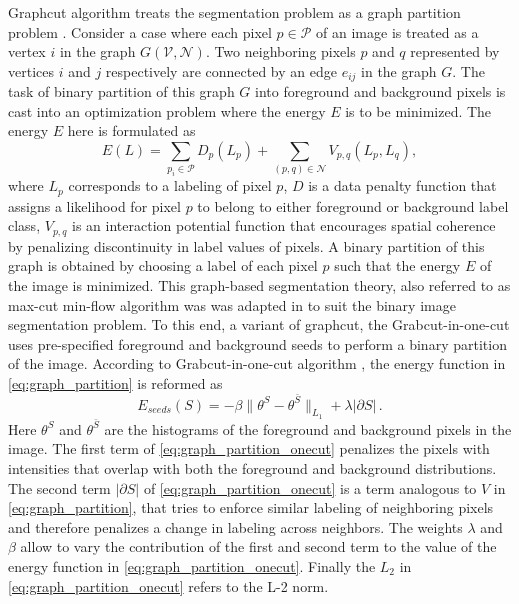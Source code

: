 \documentclass {udthesis}
\begin{document}
Graphcut algorithm treats the segmentation problem as a graph partition problem \cite{mincut_maxflow}. Consider a case where each pixel $p \in \mathcal{P}$ of an image is treated as a vertex $i$ in the graph $G(\mathcal{V},\mathcal{N})$. Two neighboring pixels $p$ and $q$ represented by vertices $i$ and $j$ respectively are connected by an edge $e_{ij}$ in the graph $G$. The task of binary partition of this graph $G$ into foreground and background pixels is cast into an optimization problem where the energy $E$ is to be minimized. The energy $E$ here is formulated as 
%
\begin{equation}	\label{eq:graph_partition}
  E(L)=\sum\limits_{p_i\in \mathcal{P}} D_p(L_p)+\sum\limits_{(p,q)\in \mathcal{N}} V_{p,q} (L_p,L_q),
\end{equation}
%
where $L_p$ corresponds to a labeling of pixel $p$, $D$ is a data penalty function that assigns a likelihood for pixel $p$ to belong to either foreground or background label class, $V_{p,q}$ is an interaction potential function that encourages spatial coherence by penalizing discontinuity in label values of pixels. A binary partition of this graph is obtained by choosing a label of each pixel $p$ such that the energy $E$ of the image is minimized. This graph-based segmentation theory, also referred to as max-cut min-flow algorithm was was adapted in \cite{onecut} to suit the binary image segmentation problem. To this end, a variant of graphcut, the Grabcut-in-one-cut \cite{onecut} uses pre-specified foreground and background seeds to perform a binary partition of the image. According to Grabcut-in-one-cut algorithm \cite{onecut}, the energy function in \eqref{eq:graph_partition} is reformed as
%
\begin{equation} \label{eq:graph_partition_onecut}
  E_{seeds}(S)=-\beta \| \theta^S-\theta^{\bar{S}} \|_{L_1}+\lambda|\partial S|\,.
\end{equation}
%
Here $\theta^S$ and $\theta^{\bar{S}}$ are the histograms of the foreground and background pixels in the image. The first term of \eqref{eq:graph_partition_onecut} penalizes the pixels with intensities that overlap with both the foreground and background distributions. The second term $|\partial S|$ of \eqref{eq:graph_partition_onecut} is a term analogous to $V$ in \eqref{eq:graph_partition}, that tries to enforce similar labeling of neighboring pixels and therefore penalizes a change in labeling across neighbors. The weights $\lambda$ and $\beta$ allow to vary the contribution of the first and second term to the value of the energy function in \eqref{eq:graph_partition_onecut}. Finally the $L_2$ in \eqref{eq:graph_partition_onecut} refers to the L-2 norm.
\end{document}
